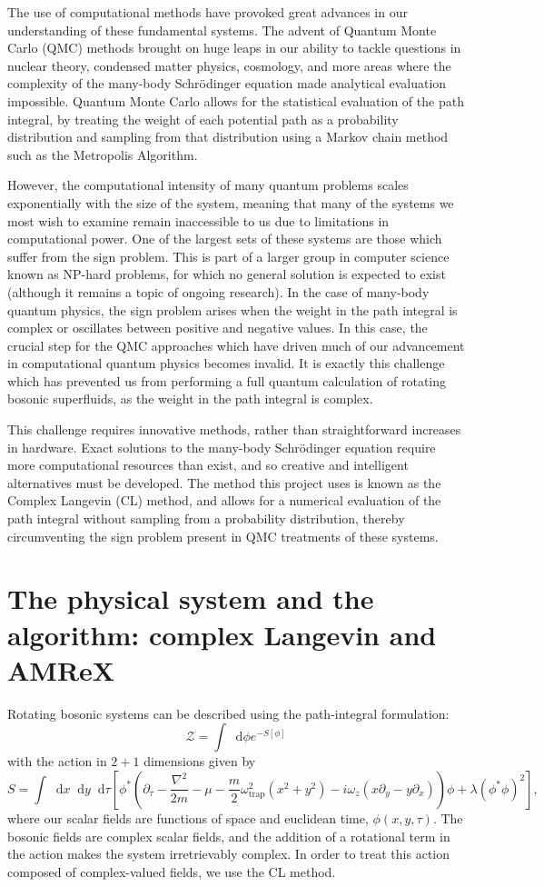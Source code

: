 \documentclass[onecolumn, 12pt]{report}
\newcommand{\beq}{\begin{equation}}
\newcommand{\eeq}{\end{equation}}
\def\CZ{{\mathcal Z}}
\def\del{{\nabla}}
\newcommand*\dif{\mathop{}\!\mathrm{d}}
\begin{document}
The use of computational methods have provoked great advances in our understanding of these fundamental systems. The advent of Quantum Monte Carlo (QMC) methods brought on huge leaps in our ability to tackle questions in nuclear theory, condensed matter physics, cosmology, and more areas where the complexity of the many-body Schr\"{o}dinger equation made analytical evaluation impossible. Quantum Monte Carlo allows for the statistical evaluation of the path integral, by treating the weight of each potential path as a probability distribution and sampling from that distribution using a Markov chain method such as the Metropolis Algorithm. 

However, the computational intensity of many quantum problems scales exponentially with the size of the system, meaning that many of the systems we most wish to examine remain inaccessible to us due to limitations in computational power. One of the largest sets of these systems are those which suffer from the sign problem. This is part of a larger group in computer science known as NP-hard problems, for which no general solution is expected to exist (although it remains a topic of ongoing research). In the case of many-body quantum physics, the sign problem  arises when the weight in the path integral is complex or oscillates between positive and negative values. In this case, the crucial step for the QMC approaches which have driven much of our advancement in computational quantum physics becomes invalid. It is exactly this challenge which has prevented us from performing a full quantum calculation of rotating bosonic superfluids, as the weight in the path integral is complex.

This challenge requires innovative methods, rather than straightforward increases in hardware. Exact solutions to the many-body Schr\"{o}dinger equation require more computational resources than exist, and so creative and intelligent alternatives must be developed. The method this project uses is known as the Complex Langevin (CL) method, and allows for a numerical evaluation of the path integral without sampling from a probability distribution, thereby circumventing the sign problem present in QMC treatments of these systems. 


\section{The physical system and the algorithm: complex Langevin and AMReX}
Rotating bosonic systems can be described using the path-integral formulation:
%
\beq
\CZ = \int \dif \phi e^{-S[\phi]}
\eeq
%
with the action in $2+1$ dimensions given by
%
\beq
S = \int \dif x \dif y \dif\tau \left[ \phi^{*}\left( \partial_{\tau} - \frac{\del^{2}}{2m} - \mu  - \frac{m}{2} \omega_{\text{trap}}^{2}(x^{2}+y^{2})- i \omega_{z}(x \partial_{y} - y\partial_{x})\right)\phi + \lambda (\phi^{*} \phi)^{2}\right],
\eeq 
%
where our scalar fields are functions of space and euclidean time, $\phi(x,y,\tau)$. The bosonic fields are complex scalar fields, and the addition of a rotational term in the action makes the system irretrievably complex. In order to treat this action composed of complex-valued fields, we use the CL method.
\end{document}
